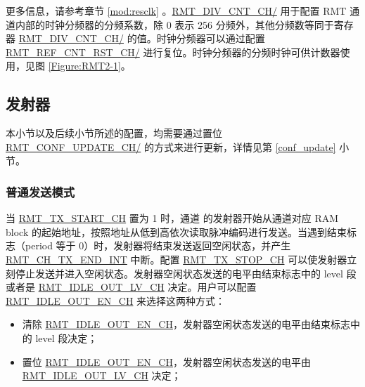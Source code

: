 \documentclass[main\_\_CN.tex]{subfiles}
\begin{document}
更多信息，请参考章节 \ref{mod:resclk} \textit{}。\hyperref[fielddesc:RMTDIVCNTCHN]{RMT\_DIV\_CNT\_CH/} 用于配置 RMT 通道内部的时钟分频器的分频系数，除 0 表示 256 分频外，其他分频数等同于寄存器 \hyperref[fielddesc:RMTDIVCNTCHN]{RMT\_DIV\_CNT\_CH/} 的值。时钟分频器可以通过配置 \hyperref[fielddesc:RMTREFCNTRSTCHN]{RMT\_REF\_CNT\_RST\_CH/} 进行复位。时钟分频器的分频时钟可供计数器使用，见图 \ref{Figure:RMT2-1}。

\subsection{发射器}
\begin{tiplisting}
本小节以及后续小节所述的配置，均需要通过置位 \hyperref[fielddesc:RMTCONFUPDATECHN]{RMT\_CONF\_UPDATE\_CH/} 的方式来进行更新，详情见第 \ref{conf_update} 小节。
\end{tiplisting}

\subsubsection{普通发送模式}\label{sec:normal-tx-mode}

当 \hyperref[fielddesc:RMTTXSTARTCHN]{RMT\_TX\_START\_CH} 置为 1 时，通道  的发射器开始从通道对应 RAM block 的起始地址，按照地址从低到高依次读取脉冲编码进行发送。当遇到结束标志（period 等于 0）时，发射器将结束发送返回空闲状态，并产生 \hyperref[int:RMTCHnTXENDINT]{RMT\_CH\_TX\_END\_INT} 中断。配置 \hyperref[fielddesc:RMTTXSTOPCHN]{RMT\_TX\_STOP\_CH} 可以使发射器立刻停止发送并进入空闲状态。发射器空闲状态发送的电平由结束标志中的 level 段或者是 \hyperref[fielddesc:RMTIDLEOUTLVCHN]{RMT\_IDLE\_OUT\_LV\_CH} 决定。用户可以配置 \hyperref[fielddesc:RMTIDLEOUTENCHN]{RMT\_IDLE\_OUT\_EN\_CH} 来选择这两种方式：
\begin{itemize}
    \item 清除 \hyperref[fielddesc:RMTIDLEOUTENCHN]{RMT\_IDLE\_OUT\_EN\_CH}，发射器空闲状态发送的电平由结束标志中的 level 段决定；
    \item 置位 \hyperref[fielddesc:RMTIDLEOUTENCHN]{RMT\_IDLE\_OUT\_EN\_CH}，发射器空闲状态发送的电平由 \hyperref[fielddesc:RMTIDLEOUTLVCHN]{RMT\_IDLE\_OUT\_LV\_CH} 决定；
\end{itemize}
\end{document}
